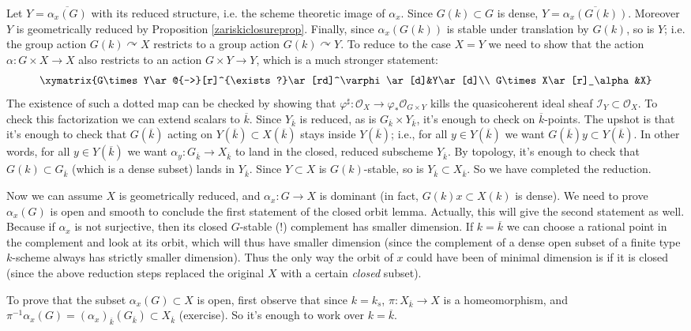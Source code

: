 \documentclass[10pt]{article}
\newcommand{\cI}{\mathcal{I}}
\newcommand{\cO}{\mathcal{O}}
\renewcommand{\phi}{\varphi}
\renewcommand{\(}{\left(}
\renewcommand{\)}{\right)}
\renewcommand{\bar}{\overline}
\newcommand{\actson}{\curvearrowright}
\numberwithin{thm}{subsection}
\begin{document}
Let $Y=\bar{\alpha_x(G)}$ with its reduced structure, i.e. the scheme theoretic image of $\alpha_x$.
Since $G(k)\subset G$ is dense, $Y=\bar{\alpha_x(G(k))}$.
Moreover $Y$ is geometrically reduced by Proposition \ref{zariskiclosureprop}.  Finally, since $\alpha_x(G(k))$ is stable under translation
by $G(k)$, so is $Y$; i.e. the group action $G(k)\actson X$
restricts to a group action $G(k)\actson Y$.
To reduce to the case $X=Y$ we need to show that the action $\alpha:G\times X\to X$ also restricts to an action $G\times Y\to Y$, which is a much stronger statement:
\[\xymatrix{G\times Y\ar@{-->}[r]^{\exists?}\ar[rd]^\phi\ar[d]&Y\ar[d]\\
G\times X\ar[r]_\alpha&X}\]
The existence of such a dotted map can be checked by showing that $\phi^\sharp:\cO_X\to \phi_*\cO_{G\times Y}$
kills the quasicoherent ideal sheaf $\cI_Y\subset\cO_X$.
To check this factorization we can extend scalars to $\bar k$.
Since $Y_{\bar k}$ is reduced, as is $G_{\bar k}\times Y_{\bar k}$,
it's enough to check on $\bar k$-points.
The upshot is that it's enough to check that $G(\bar k)$ acting on $Y(\bar k)\subset X(\bar k)$ stays inside $Y(\bar k)$;
i.e., for all $y\in Y(\bar k)$
we want $G(\bar k)y\subset Y(\bar k)$.
In other words, for all $y\in Y(\bar k)$ we want
$\alpha_y:G_{\bar k}\to X_{\bar k}$ to land in the closed, reduced
subscheme $Y_{\bar k}$. By topology, it's enough to check that $G(k)\subset G_{\bar k}$ (which is a dense subset) lands in $Y_{\bar k}$.
Since $Y\subset X$ is $G(k)$-stable, so is $Y_{\bar k}\subset X_{\bar k}$. So we have completed the reduction.

Now we can assume $X$ is geometrically reduced, and $\alpha_x:G\to X$ is dominant
(in fact, $G(k)x\subset X(k)$ is dense). We need to prove $\alpha_x(G)$ is open
and smooth to conclude the first statement of the closed orbit lemma.
Actually, this will give the second statement as well.
Because if $\alpha_x$ is not surjective, then its closed 
$G$-stable (!) 
complement has smaller dimension. If $k=\bar k$ we can choose a rational point in the complement and look at its orbit, which will thus have smaller dimension
(since the complement of a dense open subset of a finite type $k$-scheme
always has strictly smaller dimension). 
Thus the only way the orbit
of $x$ could have been of minimal dimension is if it is closed (since the above reduction steps replaced
the original $X$ with a certain {\em closed} subset).

To prove that the subset $\alpha_x(G)\subset X$ is open, first observe that
since $k=k_s$, $\pi:X_{\bar k}\to X$ is a homeomorphism,
and $\pi^{-1}\alpha_x(G)=(\alpha_x)_{\bar k}(G_{\bar k})\subset X_{\bar k}$ (exercise).
So it's enough to work over $k=\bar k$.
\end{document}
